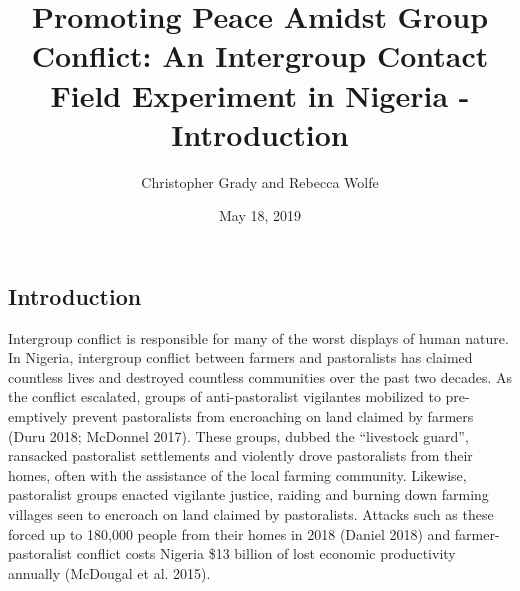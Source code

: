 \documentclass[11pt]{article}
\title{Promoting Peace Amidst Group Conflict: An Intergroup Contact Field
Experiment in Nigeria - Introduction}
\author{
Christopher Grady and Rebecca Wolfe
}
\date{May 18, 2019}
\begin{document}
\VerbatimFootnotes

%
%
%
%
%
%
%
%
%
%

\maketitle

\subsection{Introduction}\label{introduction}

Intergroup conflict is responsible for many of the worst displays of
human nature. In Nigeria, intergroup conflict between farmers and
pastoralists has claimed countless lives and destroyed countless
communities over the past two decades. As the conflict escalated, groups
of anti-pastoralist vigilantes mobilized to pre-emptively prevent
pastoralists from encroaching on land claimed by farmers (Duru 2018;
McDonnel 2017). These groups, dubbed the ``livestock guard'', ransacked
pastoralist settlements and violently drove pastoralists from their
homes, often with the assistance of the local farming community.
Likewise, pastoralist groups enacted vigilante justice, raiding and
burning down farming villages seen to encroach on land claimed by
pastoralists. Attacks such as these forced up to 180,000 people from
their homes in 2018 (Daniel 2018) and farmer-pastoralist conflict costs
Nigeria \$13 billion of lost economic productivity annually (McDougal et
al. 2015).
\end{document}
